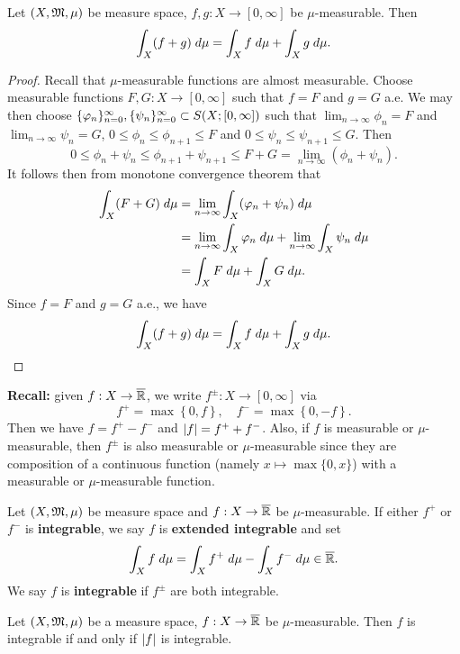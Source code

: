 \documentclass[a4paper]{article}
\begin{document}
\begin{thm}
Let $(X, \mathfrak{M}, \mu)$ be measure space, $f, g : X \to [0, \infty]$
be $\mu$-measurable. Then
\[
\int_X (f + g) \; d \mu = \int_X f \; d \mu + \int_X g \; d \mu.
\]
\end{thm}

\begin{proof}
Recall that $\mu$-measurable functions are almost
measurable. Choose measurable functions
$F, G : X \to [0, \infty]$ such that $f = F$
and $g = G$ a.e. We may then choose
$\{ \varphi_n \}_{n=0}^\infty, \{ \psi_n \}_{n=0}^\infty \subset S(X; [0, \infty])$
such that $\lim_{n \to \infty} \phi_n = F$
and $\lim_{n \to \infty} \psi_n = G$,
$0 \leq \phi_n \leq \phi_{n+1} \leq F$
and $0 \leq \psi_n \leq \psi_{n+1} \leq G$.
Then
\[
0 \leq \phi_n + \psi_n \leq \phi_{n+1} + \psi_{n+1}
\leq F + G = \lim_{n \to \infty} (\phi_n + \psi_n).
\]
It follows then from monotone convergence theorem that
\[
\begin{aligned}
\int_X (F + G) \; d \mu
&= \lim_{n \to \infty} \int_X (\varphi_n + \psi_n) \; d \mu \\
&= \lim_{n \to \infty} \int_X \varphi_n \; d \mu
+ \lim_{n \to \infty} \int_X \psi_n \; d \mu \\
&= \int_X F \; d \mu + \int_X G \; d \mu.
\end{aligned}
\]
Since $f = F$ and $g = G$ a.e., we have
\[
\int_X (f + g) \; d \mu = \int_X f \; d \mu + \int_X g \; d \mu.
\]
\end{proof}

\textbf{Recall:} given $f: X \to \overline{\mathbb{R}}$,
we write $f^{\pm} : X \to [0, \infty]$ via
\[
f^+ = \max\left\{ 0, f \right\}, \quad
f^- = \max\left\{ 0, -f \right\}.
\]
Then we have $f = f^+ - f^-$ and
$\left\lvert f\right\rvert = f^+ + f^-$. Also, if $f$ is measurable or
$\mu$-measurable, then $f^\pm$ is also measurable or
$\mu$-measurable since they are composition of a
continuous function (namely $x \mapsto \max \{0, x\}$)
with a measurable or $\mu$-measurable
function.

\begin{defi}
Let $(X, \mathfrak{M}, \mu)$ be measure space and
$f : X \to \overline{\mathbb{R}}$ be $\mu$-measurable.
If either $f^+$ or $f^-$ is \textbf{integrable},
we say $f$ is \textbf{extended integrable} and
set
\[
\int_X f \; d \mu = \int_X f^+ \; d \mu - \int_X f^- \; d \mu
\in \overline{\mathbb{R}}.
\]
We say $f$ is \textbf{integrable} if $f^\pm$ are both
integrable.
\end{defi}

\begin{prop}
Let $(X, \mathfrak{M}, \mu)$ be a measure space, $f : X \to \overline{\mathbb{R}}$
be $\mu$-measurable. Then $f$ is integrable
if and only if $\left\lvert f\right\rvert$ is integrable.
\end{prop}
\end{document}

